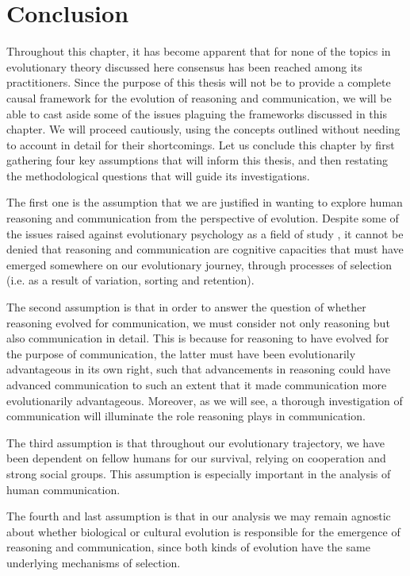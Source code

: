 \section{Conclusion}
\label{sec:evo-conclusion}
Throughout this chapter, it has become apparent that for none of the topics in evolutionary theory discussed here consensus has been reached among its practitioners. Since the purpose of this thesis will not be to provide a complete causal framework for the evolution of reasoning and communication, we will be able to cast aside some of the issues plaguing the frameworks discussed in this chapter. We will proceed cautiously, using the concepts outlined without needing to account in detail for their shortcomings.
Let us conclude this chapter by first gathering four key assumptions that will inform this thesis, and then restating the methodological questions that will guide its investigations.

The first one is the assumption that we are justified in wanting to explore human reasoning and communication from the perspective of evolution. Despite some of the issues raised against evolutionary psychology as a field of study \citep{LB02}, it cannot be denied that reasoning and communication are cognitive capacities that must have emerged somewhere on our evolutionary journey, through processes of selection (i.e. as a result of variation, sorting and retention).

The second assumption is that in order to answer the question of whether reasoning evolved for communication, we must consider not only reasoning but also communication in detail. This is because for reasoning to have evolved for the purpose of communication, the latter must have been evolutionarily advantageous in its own right, such that advancements in reasoning could have advanced communication to such an extent that it made communication more evolutionarily advantageous.
Moreover, as we will see, a thorough investigation of communication will illuminate the role reasoning plays in communication.

The third assumption is that throughout our evolutionary trajectory, we have been dependent on fellow humans for our survival, relying on cooperation and strong social groups. This assumption is especially important in the analysis of human communication.

The fourth and last assumption is that in our analysis we may remain agnostic about whether biological or cultural evolution is responsible for the emergence of reasoning and communication, since both kinds of evolution have the same underlying mechanisms of selection.

